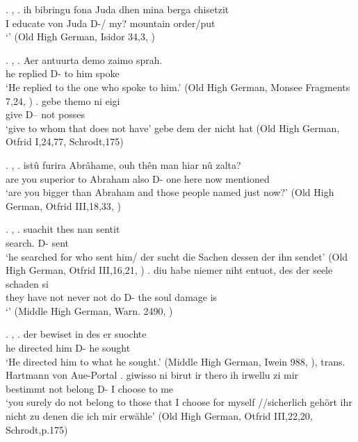 \ex. , 
\ag. ih bibringu fona Juda dhen mina berga chisetzit\\
  I educate von Juda D-/ my? mountain order/put\\
  `' \hfill (Old High German, Isidor 34,3, \citealt[761]{behaghel1923})

\ex. , 
\ag. Aer antuurta demo zaimo sprah.\\
he replied\scsub{[dat]} D- {to him} spoke\scsub{[nom]}\\
`He replied to the one who spoke to him.' \hfill (Old High German, Monsee Fragments 7,24, \citealt[761]{behaghel1923})
\bg. gebe themo ni eigi\\
 give\scsub{[dat]} D-- not posses\scsub{[nom]}\\
 `give to whom that does not have' gebe dem der nicht hat \hfill (Old High German, Otfrid I,24,77, Schrodt,175)

 \ex. , 
 \ag. istû furira Abrâhame, ouh thên man hiar nû zalta?\\
  {are you} {superior to}\scsub{[dat]} Abraham also D- one here now mentioned\scsub{[acc]}\\
  `are you bigger than Abraham and those people named just now?' \hfill (Old High German, Otfrid III,18,33, \citealt[761]{behaghel1923})

\ex. , 
\ag. suachit thes nan sentit\\
 search. D-  sent\\
 `he searched for who sent him/ der sucht die Sachen dessen der ihn sendet' \hfill (Old High German, Otfrid III,16,21, \citealt[761]{behaghel1923})
\bg. diu habe niemer niht entuot, des der seele schaden si\\
 they have not never {not do} D- the soul damage is\scsub{[nom]}\\
 `' \hfill (Middle High German, Warn. 2490, \citealt[761]{behaghel1923})

\ex. , 
\ag. der bewiset in des er suochte\\
 he directed\scsub{[gen]} him D- he sought\scsub{[acc]}\\
 `He directed him to what he sought.' \hfill (Middle High German, Iwein 988, \citealt[761]{behaghel1923}), trans. Hartmann von Aue-Portal
\bg. giwisso ni birut ir thero ih irwellu zi mir\\
 bestimmt not belong\scsub{[gen]}  D- I choose\scsub{[acc]} to me\\
 `you surely do not belong to those that I choose for myself //sicherlich gehört ihr nicht zu denen die ich mir erwähle' \hfill (Old High German, Otfrid III,22,20, Schrodt,p.175)

